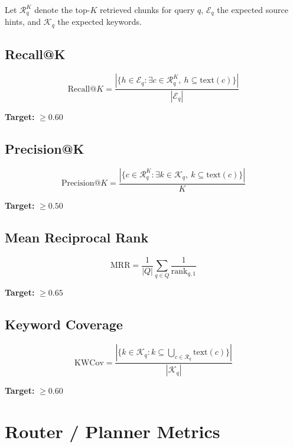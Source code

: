 \documentclass[12pt,a4paper]{report}
\begin{document}
Let $\mathcal{R}_q^K$ denote the top-$K$ retrieved chunks for query $q$, $\mathcal{E}_q$ the expected source hints, and $\mathcal{K}_q$ the expected keywords.

\subsection{Recall@K}

\begin{equation}
  \text{Recall@}K = \frac{|\{h \in \mathcal{E}_q : \exists c \in \mathcal{R}_q^K,\ h \subseteq \text{text}(c)\}|}{|\mathcal{E}_q|}
\end{equation}

\textbf{Target:} $\geq 0.60$

\subsection{Precision@K}

\begin{equation}
  \text{Precision@}K = \frac{|\{c \in \mathcal{R}_q^K : \exists k \in \mathcal{K}_q,\ k \subseteq \text{text}(c)\}|}{K}
\end{equation}

\textbf{Target:} $\geq 0.50$

\subsection{Mean Reciprocal Rank}

\begin{equation}
  \text{MRR} = \frac{1}{|Q|}\sum_{q \in Q} \frac{1}{\text{rank}_{q,1}}
\end{equation}

\textbf{Target:} $\geq 0.65$

\subsection{Keyword Coverage}

\begin{equation}
  \text{KWCov} = \frac{|\{k \in \mathcal{K}_q : k \subseteq \bigcup_{c \in \mathcal{R}_q}\text{text}(c)\}|}{|\mathcal{K}_q|}
\end{equation}

\textbf{Target:} $\geq 0.60$

\section{Router / Planner Metrics}
\end{document}

